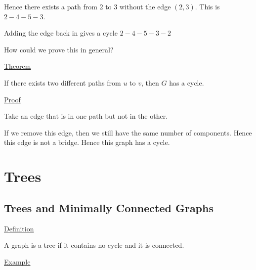 \documentclass{article}
\begin{document}
Hence there exists a path from 2 to 3 without the edge $(2,3)$. This is $2-4-5-3$. 

Adding the edge back in gives a cycle $2-4-5-3-2$

How could we prove this in general?

\underline{Theorem}

If there exists two different paths from $u$ to $v$, then $G$ has a cycle. 

\underline{Proof}

Take an edge that is in one path but not in the other. 

If we remove this edge, then we still have the same number of components. Hence this edge is not a bridge. Hence this graph has a cycle. 

\section{Trees}

\subsection{Trees and Minimally Connected Graphs}

\underline{Definition}

A graph is a tree if it contains no cycle and it is connected. 

\underline{Example}

\begin{center}
\end{center}
\end{document}
